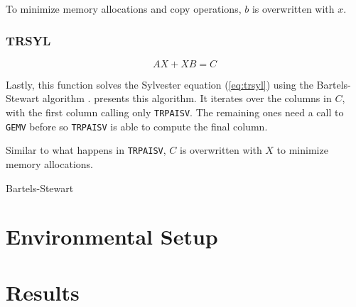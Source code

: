 \documentclass[../thesis]{subfiles}
\begin{document}
		To minimize memory allocations and copy operations, $b$ is overwritten with $x$.

		\subsubsection{TRSYL}
		\begin{equation}
			AX + XB = C
			\label{eq:trsyl}
		\end{equation}

		Lastly, this function solves the Sylvester equation (\cref{eq:trsyl}) using the Bartels-Stewart algorithm \cite[367-368]{Golub:Loan:MC:1996}.  presents this algorithm. It iterates over the columns in $C$, with the first column calling only \texttt{TRPAISV}. The remaining ones need a call to \texttt{GEMV} before so \texttt{TRPAISV} is able to compute the final column.

		Similar to what happens in \texttt{TRPAISV}, $C$ is overwritten with $X$ to minimize memory allocations.

		\begin{algorithm}[htp]
			\caption{Bartels-Stewart}
			\label{alg:bartel_stewart}
			\DontPrintSemicolon



		\end{algorithm}

	\section{Environmental Setup}
	\section{Results}
\end{document}
